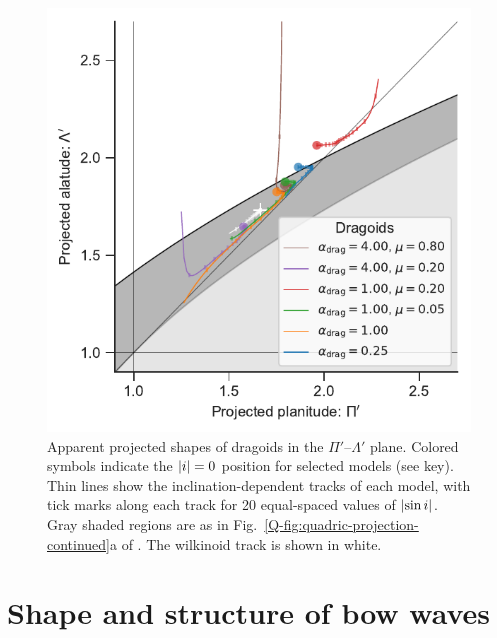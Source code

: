 \begin{figure}
  \centering
  \includegraphics[width=\linewidth]{figs/dragoid-R90-vs-Rc}
  \caption{Apparent projected shapes of dragoids in the
    \(\Pi'\)--\(\Lambda'\) plane. Colored symbols indicate the
    \(\lvert i\rvert = 0\) position for selected models (see key).  Thin
    lines show the inclination-dependent tracks of each model, with
    tick marks along each track for 20 equal-spaced values of
    \(\lvert\sin i\rvert\). Gray shaded regions are as in
    Fig.~\ref{Q-fig:quadric-projection-continued}a of \PaperI{}.  The
    wilkinoid track is shown in white. }
  \label{fig:dragoid-Rc-R90}
\end{figure}


\section{Shape and structure of bow waves}
\label{sec:shape-bow-wave}



